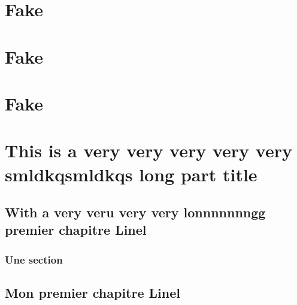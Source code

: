 \documentclass[12pt,fleqn]{thesis}
\begin{document}
\frontmatter

\setlength{\parskip}{1em}


\restoregeometry




\tableofcontents
\listoffigures
\listoftables

\mainmatter
\setlength{\parskip}{1em}

	\newrefsection

	\printbibliography[segment=\therefsegment,heading=subbibliography]



	\part{Fake}
	\part{Fake}
	\part{Fake}

	\part{This is a very very very very very smldkqsmldkqs long part title}
	\chapter{With a very veru very very lonnnnnnngg premier chapitre Linel}
	\section{Une section}
	\kant[1-10]

	
	\chapter{Mon premier chapitre Linel}
\end{document}
